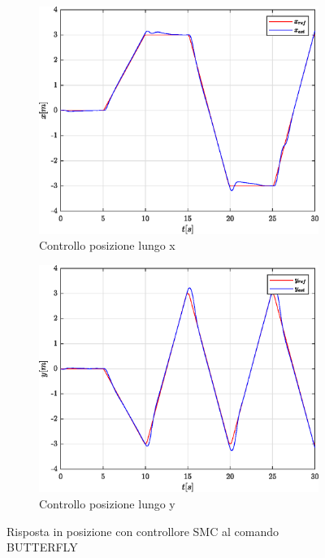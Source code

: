 \begin{figure}
	\centering
	\begin{subfigure}{0.45\textwidth}
		\centering
		\includegraphics[width=1\textwidth]{Simulazioni/Figure/SMC/BUTTERFLY/PositionControlXPos}
		\caption{Controllo posizione lungo x}
		\label{fig:BUTTERFLYerrposxSMC}
	\end{subfigure}
	\hfill
	\begin{subfigure}{0.45\textwidth}
		\centering
		\includegraphics[width=1\textwidth]{Simulazioni/Figure/SMC/BUTTERFLY/PositionControlYPos}
		\caption{Controllo posizione lungo y}
		\label{fig:BUTTERFLYerrposySMC}
	\end{subfigure}
	\caption{Risposta in posizione con controllore SMC al comando BUTTERFLY}
\end{figure}

